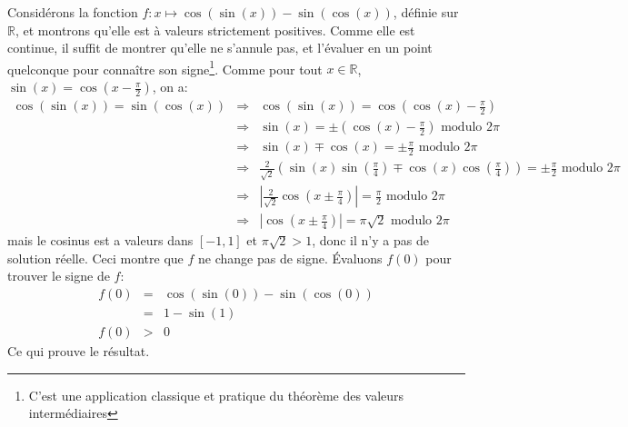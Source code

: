 Considérons la fonction $f:x\mapsto \cos(\sin(x))-\sin(\cos(x))$, définie sur $\mathbb{R}$, et montrons qu'elle est à valeurs strictement positives. Comme elle est continue, il suffit de montrer qu'elle ne s'annule pas, et l’évaluer en un point quelconque pour connaître son signe\footnote{C'est une application classique et pratique du théorème des valeurs intermédiaires}. Comme pour tout $x\in\mathbb{R}$, $\sin(x)=\cos\left( x-\frac{\pi}{2}\right)$, on a:
\begin{eqnarray*}
  \cos(\sin(x)) = \sin(\cos(x)) &\Rightarrow& \cos(\sin(x)) = \cos\left(\cos(x) - \frac{\pi}{2}\right) \\
  &\Rightarrow& \sin(x) = \pm \left( \cos(x) - \frac{\pi}{2} \right) \textrm{ modulo } 2\pi \\
    &\Rightarrow& \sin(x) \mp \cos(x) = \pm \frac{\pi}{2} \textrm{ modulo } 2\pi \\
    &\Rightarrow&   \frac{2}{\sqrt{2}}  \left( \sin(x)\sin\left(\frac{\pi}{4}\right) \mp \cos(x)\cos\left(\frac{\pi}{4}\right) \right) = \pm \frac{\pi}{2} \textrm{ modulo } 2\pi \\
    &\Rightarrow& \left| \frac{2}{\sqrt{2}} \cos\left(x \pm \frac{\pi}{4} \right) \right| = \frac{\pi}{2} \textrm{ modulo } 2\pi \\
   &\Rightarrow&  \left| \cos\left(x \pm \frac{\pi}{4} \right) \right| = \pi\sqrt{2} \textrm{ modulo } 2\pi 
\end{eqnarray*}
mais le cosinus est a valeurs dans $[-1,1]$ et $\pi\sqrt{2}>1$, donc il n'y a pas de solution réelle. Ceci montre que $f$ ne change pas de signe. Évaluons $f(0)$ pour trouver le signe de $f$:
\begin{eqnarray*}
    f(0) &=& \cos(\sin(0))-\sin(\cos(0)) \\
    &=& 1-\sin(1) \\
    f(0) &>& 0
\end{eqnarray*}
Ce qui prouve le résultat.
